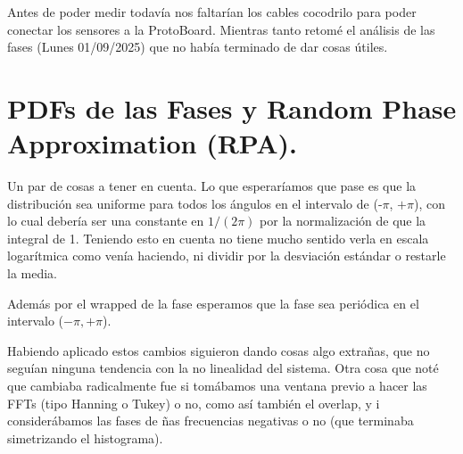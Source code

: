
Antes de poder medir todavía nos faltarían los cables cocodrilo para poder conectar los sensores a la ProtoBoard. Mientras tanto retomé el análisis de las fases (Lunes 01/09/2025) que no había terminado de dar cosas útiles. 

\section{PDFs de las Fases y Random Phase Approximation (RPA). } 

Un par de cosas a tener en cuenta. Lo que esperaríamos que pase es que la distribución sea uniforme para todos los ángulos en el intervalo de (-$\pi$, $+\pi$), con lo cual debería ser una constante en $1/(2\pi)$ por la normalización de que la integral de 1. Teniendo esto en cuenta no tiene mucho sentido verla en escala logarítmica como venía haciendo, ni dividir por la desviación estándar o restarle la media. 

Además por el wrapped de la fase esperamos que la fase sea periódica en el intervalo ($-\pi, +\pi$). 

Habiendo aplicado estos cambios siguieron dando cosas algo extrañas, que no seguían ninguna tendencia con la no linealidad del sistema. Otra cosa que noté que cambiaba radicalmente fue si tomábamos una ventana previo a hacer las FFTs (tipo Hanning o Tukey) o no, como así también el overlap, y i considerábamos las fases de ñas frecuencias negativas o no (que terminaba simetrizando el histograma).  


